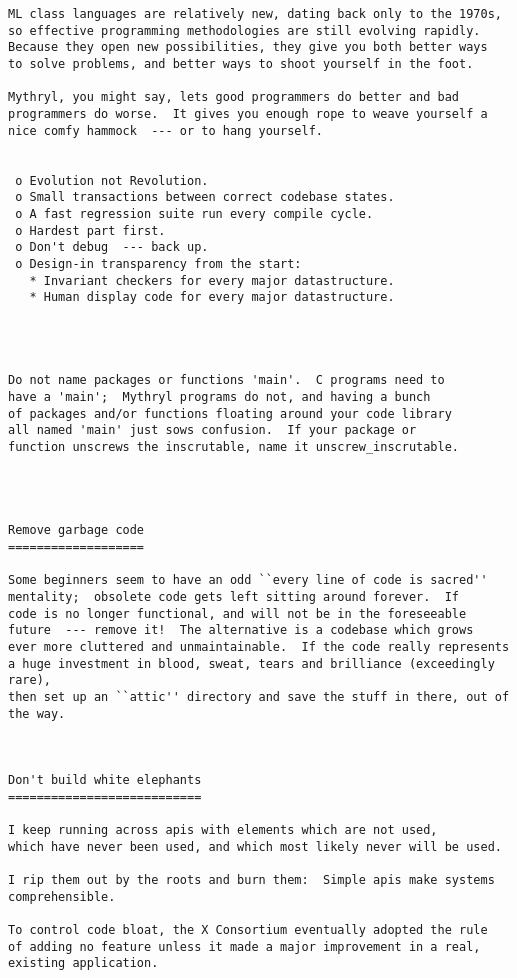 \begin{verbatim}
ML class languages are relatively new, dating back only to the 1970s, 
so effective programming methodologies are still evolving rapidly. 
Because they open new possibilities, they give you both better ways 
to solve problems, and better ways to shoot yourself in the foot. 

Mythryl, you might say, lets good programmers do better and bad 
programmers do worse.  It gives you enough rope to weave yourself a 
nice comfy hammock  --- or to hang yourself. 


 o Evolution not Revolution. 
 o Small transactions between correct codebase states. 
 o A fast regression suite run every compile cycle. 
 o Hardest part first. 
 o Don't debug  --- back up. 
 o Design-in transparency from the start: 
   * Invariant checkers for every major datastructure. 
   * Human display code for every major datastructure. 




Do not name packages or functions 'main'.  C programs need to 
have a 'main';  Mythryl programs do not, and having a bunch 
of packages and/or functions floating around your code library 
all named 'main' just sows confusion.  If your package or 
function unscrews the inscrutable, name it unscrew_inscrutable. 




Remove garbage code 
=================== 

Some beginners seem to have an odd ``every line of code is sacred'' 
mentality;  obsolete code gets left sitting around forever.  If 
code is no longer functional, and will not be in the foreseeable 
future  --- remove it!  The alternative is a codebase which grows 
ever more cluttered and unmaintainable.  If the code really represents 
a huge investment in blood, sweat, tears and brilliance (exceedingly rare), 
then set up an ``attic'' directory and save the stuff in there, out of 
the way. 



Don't build white elephants 
=========================== 

I keep running across apis with elements which are not used, 
which have never been used, and which most likely never will be used. 

I rip them out by the roots and burn them:  Simple apis make systems comprehensible. 

To control code bloat, the X Consortium eventually adopted the rule 
of adding no feature unless it made a major improvement in a real, 
existing application. 


\end{verbatim}
